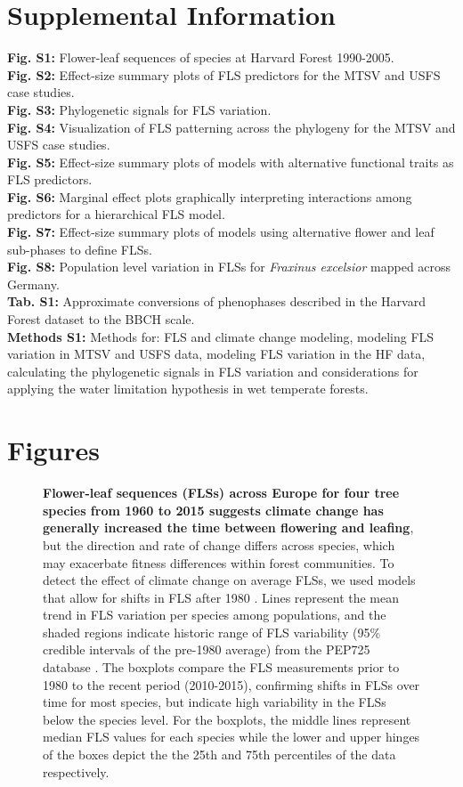 \documentclass[11pt]{article}
\begin{document}
\newpage
\section*{Supplemental Information}
\textbf{Fig. S1:} Flower-leaf sequences of species at Harvard Forest 1990-2005.\\
\textbf{Fig. S2:} Effect-size summary plots of FLS predictors for the MTSV and USFS case studies. \\
\textbf{Fig. S3:} Phylogenetic signals for FLS variation.\\
\textbf{Fig. S4:} Visualization of FLS patterning across the phylogeny for the MTSV and USFS case studies.\\
\textbf{Fig. S5:} Effect-size summary plots of models with alternative functional traits as FLS predictors.\\
\textbf{Fig. S6:} Marginal effect plots graphically interpreting interactions among predictors for a hierarchical FLS model.\\
\textbf{Fig. S7:} Effect-size summary plots of models using alternative flower and leaf sub-phases to define FLSs.\\
\textbf{Fig. S8:} Population level variation in FLSs for \emph{Fraxinus excelsior} mapped across Germany.\\
\textbf{Tab. S1:} Approximate conversions of phenophases described in the Harvard Forest dataset to the BBCH scale.\\
\textbf{Methods S1:} Methods for: FLS and climate change modeling, modeling FLS variation in MTSV and USFS data, modeling FLS variation in the HF data, calculating the phylogenetic signals in FLS variation and considerations for applying the water limitation hypothesis in wet temperate forests.
\newpage
\section*{Figures}


\begin{figure}[h!]
    \centering
    \caption{\textbf{Flower-leaf sequences (FLSs) across Europe for four tree species from 1960 to 2015 suggests climate change has generally increased the time between flowering and leafing}, but the direction and rate of change differs across species, which may exacerbate fitness differences within forest communities. To detect the effect of climate change on average FLSs, we used models that allow for shifts in FLS after 1980 \citep{Kharouba2018}. Lines represent the mean trend in FLS variation per species among populations, and the shaded regions indicate historic range of FLS variability (95\% credible intervals of the pre-1980 average) from the PEP725 database \citep{PEP725}. The boxplots compare the FLS measurements prior to 1980 to the recent period (2010-2015), confirming shifts in FLSs over time for most species, but indicate high variability in the FLSs below the species level. For the boxplots, the middle lines represent median FLS values for each species while the lower and upper hinges of the boxes depict the the 25th and 75th percentiles of the data respectively.}
    \label{fig:climchange}
\end{figure}
\end{document}
